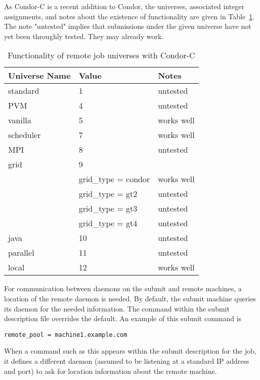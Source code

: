 As Condor-C is a recent addition to Condor,
the universes, associated integer assignments,
and notes about the existence of functionality are given in 
Table~\ref{working-remote-universes}.
The note "untested" implies that
submissions under the given universe have not yet
been throughly tested.
They may already work.

\begin{center}
\begin{table}[hbt]
\begin{tabular}{|l|l|l}
\textbf{Universe Name} & \textbf{Value} & \textbf{Notes}\\ \hline \hline
standard  & 1 & untested \\ \hline
PVM       & 4 & untested \\ \hline
vanilla   & 5 & works well \\ \hline
scheduler & 7 & works well \\ \hline
MPI       & 8 & untested \\ \hline
grid      & 9 & \\
 & grid\_type = condor & works well \\
 & grid\_type = gt2  & untested \\
 & grid\_type = gt3 & untested \\
 & grid\_type = gt4 & untested \\ \hline
java & 10 & untested \\ \hline
parallel & 11 & untested \\ \hline
local & 12 & works well \\ \hline
\end{tabular}
\caption{\label{working-remote-universes}Functionality of remote job universes with Condor-C}
\end{table}
\end{center}

For communication between  daemons on the submit
and remote machines,
a location of the remote  daemon is needed.
By default, the submit machine queries its 
daemon for the needed information.
The 
command within the submit
description file overrides the default.
An example of this submit command is
\footnotesize
\begin{verbatim}
remote_pool = machine1.example.com
\end{verbatim}
\normalsize
When a command such as this appears within the submit description
for the job,
it defines a different  daemon 
(assumed to be listening at a standard IP address and port)
to ask for location information about the remote machine.

